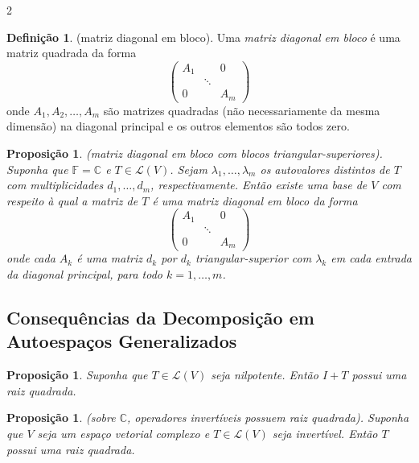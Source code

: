 \documentclass{article}
\theoremstyle{plain}
\newtheorem{prop}[thm]{Proposição}
\theoremstyle{definition}
\newtheorem{defn}{Definição}[section]
\theoremstyle{remark}
\begin{document}
\begin{multicols}{2}
\begin{defn} (matriz diagonal em bloco).
    Uma \emph{matriz diagonal em bloco} é uma matriz quadrada da forma 
    \[
        \begin{pmatrix*}
            A_1 & & 0 \\
            & \ddots & \\
            0 & & A_m
        \end{pmatrix*}
    \]
    \noindent onde \(A_1, A_2, \ldots, A_m\) são matrizes quadradas (não necessariamente da mesma dimensão) na diagonal principal e os outros elementos são todos zero.
\end{defn}

\begin{prop} (matriz diagonal em bloco com blocos triangular-superiores).
    Suponha que \(\mathbb{F} = \mathbb{C}\) e \(T \in \mathcal{L}(V)\). Sejam \(\lambda_1, \ldots, \lambda_m\) os autovalores distintos de \(T\) com multiplicidades \(d_1, \ldots, d_m\), respectivamente. Então existe uma base de \(V\) com respeito à qual a matriz de \(T\) é uma matriz diagonal em bloco da forma
    \[
        \begin{pmatrix*}
            A_1 & & 0 \\
            & \ddots & \\
            0 & & A_m
        \end{pmatrix*}
    \]
    \noindent onde cada \(A_k\) é uma matriz \(d_k\) por \(d_k\) triangular-superior com \(\lambda_k\) em cada entrada da diagonal principal, para todo \(k = 1, \ldots, m\).
\end{prop}

\subsection{Consequências da Decomposição em Autoespaços Generalizados}

\begin{prop}
    Suponha que \(T \in \mathcal{L}(V)\) seja nilpotente. Então \(I + T\) possui uma raiz quadrada.
\end{prop}

\begin{prop} (sobre \(\mathbb{C}\), operadores invertíveis possuem raiz quadrada).
    Suponha que \(V\) seja um espaço vetorial complexo e \(T \in \mathcal{L}(V)\) seja invertível. Então \(T\) possui uma raiz quadrada.
\end{prop}


\end{multicols}
\end{document}
